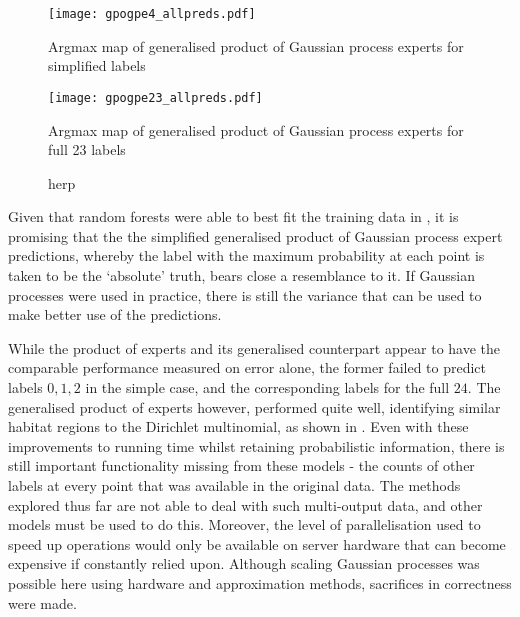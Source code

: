 \begin{figure}
    \begin{minipage}{\linewidth}
        \texttt{[image: gpogpe4\_allpreds.pdf]}
        \caption{Argmax map of generalised product of Gaussian process experts for simplified labels}
        \label{fig:gpogpe4}
    \end{minipage}

    \begin{minipage}{\linewidth}
        \texttt{[image: gpogpe23\_allpreds.pdf]}
        \caption{Argmax map of generalised product of Gaussian process experts for full 23 labels }
        \label{fig:gpogpe23}
    \end{minipage}

    \caption{herp}
\end{figure}

Given that random forests were able to best fit the training data in , it is promising that the the simplified generalised product of Gaussian process expert predictions, whereby the label with the maximum probability at each point is taken to be the `absolute' truth, bears close a resemblance to it. If Gaussian processes were used in practice, there is still the variance that can be used to make better use of the predictions. 

While the product of experts and its generalised counterpart appear to have the comparable performance measured on error alone, the former failed to predict labels $0, 1, 2$ in the simple case, and the corresponding labels for the full $24$. The generalised product of experts however, performed quite well, identifying similar habitat regions to the Dirichlet multinomial, as shown in . Even with these improvements to running time whilst retaining probabilistic information, there is still important functionality missing from these models - the counts of other labels at every point that was available in the original data. The methods explored thus far are not able to deal with such multi-output data, and other models must be used to do this. Moreover, the level of parallelisation used to speed up operations would only be available on server hardware that can become expensive if constantly relied upon. Although scaling Gaussian processes was possible here using hardware and approximation methods, sacrifices in correctness were made. 

